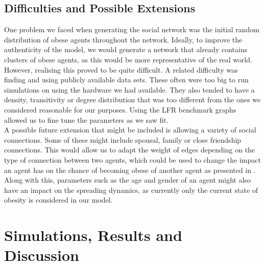 \documentclass[11pt]{article}
\begin{document}
\subsection{Difficulties and Possible Extensions}

One problem we faced when generating the social network was the initial random distribution of obese agents throughout the network. Ideally, to improve the authenticity of the model, we would generate a network that already contains clusters of obese agents, as this would be more representative of the real world. However, realising this proved to be quite difficult. A related difficulty was finding and using publicly available data sets. These often were too big to run simulations on using the hardware we had available. They also tended to have a density, transitivity or degree distribution that was too different from the ones we considered reasonable for our purposes. Using the LFR benchmark graphs\cite{Lancichinetti_2008} allowed us to fine tune the parameters as we saw fit.\\

A possible future extension that might be included is allowing a variety of social connections. Some of these might include spousal, family or close friendship connections. This would allow us to adapt the weight of edges depending on the type of connection between two agents, which could be used to change the impact an agent has on the chance of becoming obese of another agent as presented in \cite{spreadOfObesityPaper}. Along with this, parameters such as the age and gender of an agent might also have an impact on the spreading dynamics, as currently only the current state of obesity is considered in our model. \\

\section{Simulations, Results and Discussion}
\end{document}
